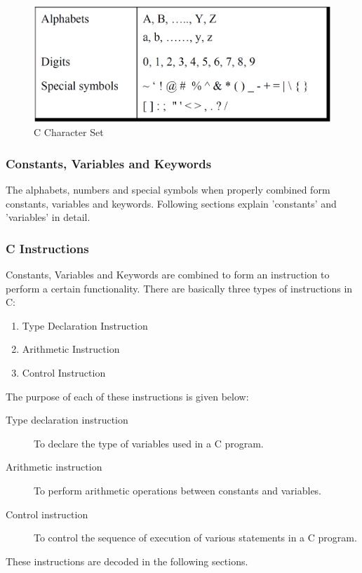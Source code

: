 \begin{figure}[H]
    \begin{center}
        \includegraphics[width=\textwidth]{images/CCharSet.png}
        \caption{C Character Set}
        \label{CCharSet}
    \end{center}
\end{figure}

\subsubsection{Constants, Variables and Keywords}
The alphabets, numbers and special symbols when properly combined form constants, variables and keywords. Following sections explain 'constants' and 'variables' in detail. 

\subsubsection{C Instructions}
Constants, Variables and Keywords are combined to form an instruction to perform a certain functionality. There are basically three types of instructions in C:

\begin{enumerate}
    \item Type Declaration Instruction
    \item Arithmetic Instruction
    \item Control Instruction
\end{enumerate}

The purpose of each of these instructions is given below:
\begin{description}
    \item[Type declaration instruction] To declare the type of variables used in a C program.
    \item[Arithmetic instruction] To perform arithmetic operations between constants and variables.
    \item[Control instruction] To control the sequence of execution of various statements in a C program.
\end{description}
These instructions are decoded in the following sections.

